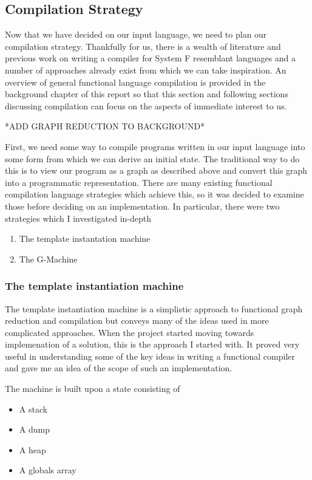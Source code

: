 \documentclass[11pt]{article}
\begin{document}
\subsection{Compilation Strategy}
Now that we have decided on our input language, we need to plan our compilation
strategy. Thankfully for us, there is a wealth of literature and previous work
on writing a compiler for System F resemblant languages and a number of approaches
already exist from which we can take inspiration. An overview of general 
functional language compilation is provided in the background chapter of this
report so that this section and following sections discussing compilation can 
focus on the aspects of immediate interest to us.

*ADD GRAPH REDUCTION TO BACKGROUND*

First, we need some way to compile programs written in our input language into
some form from which we can derive an initial state. The traditional way to
do this is to view our program as a graph as described above and convert this
graph into a programmatic representation. There are many existing functional
compilation language strategies which achieve this, so it was decided to 
examine those before deciding on an implementation. In particular, there were
two strategies which I investigated in-depth

\begin{enumerate}
	\item The template instantation machine
	\item The G-Machine
\end{enumerate}

\subsubsection{The template instantiation machine} 
The template instantiation machine is a simplistic approach to
functional graph reduction and compilation but conveys many of 
the ideas used in more complicated approaches. When the project
started moving towards implemenation of a solution, this is the
approach I started with. It proved very useful in understanding
some of the key ideas in writing a functional compiler and gave
me an idea of the scope of such an implementation. 

The machine is built upon a state consisting of
\begin{itemize}
	\item A stack
	\item A dump
	\item A heap
	\item A globals array
\end{itemize}
\end{document}
